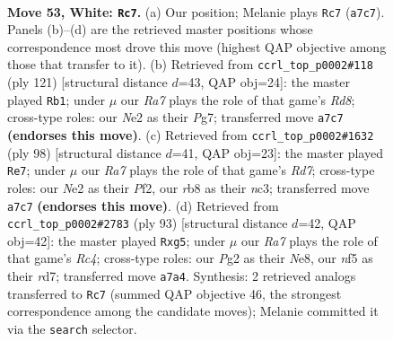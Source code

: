 \documentclass[11pt]{article}
\begin{document}
\clearpage

\begin{figure}[p]\centering
\begin{subfigure}{0.46\textwidth}\centering
\resizebox{\linewidth}{!}{%
\newchessgame
\chessboard[
  setfen={1r6/R7/3pk3/5npp/8/1p6/1R2NKPr/8 w - - 4 53},
  showmover=false,
  pgfstyle=straightmove, color=movearrow, markmove={a7-c7}
]}
\caption{}
\end{subfigure}\hfill
\begin{subfigure}{0.46\textwidth}\centering
\resizebox{\linewidth}{!}{%
\newchessgame
\chessboard[
  setfen={1r4k1/6p1/7p/1P2R2P/8/1N6/R1p2KP1/3r4 b - - 0 61},
  showmover=false,
  pgfstyle=straightmove, color=movearrow, markmove={d1-b1}
]}
\caption{}
\end{subfigure}
\\[4pt]
\begin{subfigure}{0.46\textwidth}\centering
\resizebox{\linewidth}{!}{%
\newchessgame
\chessboard[
  setfen={4N3/3R4/r6p/4b1pk/4p3/2n5/5PKP/4R3 w - - 6 50},
  showmover=false,
  pgfstyle=straightmove, color=movearrow, markmove={d7-e7}
]}
\caption{}
\end{subfigure}\hfill
\begin{subfigure}{0.46\textwidth}\centering
\resizebox{\linewidth}{!}{%
\newchessgame
\chessboard[
  setfen={R3nk2/3R4/p5p1/2r3P1/P2N4/1P2r3/1K6/8 b - - 20 47},
  showmover=false,
  pgfstyle=straightmove, color=movearrow, markmove={c5-g5}
]}
\caption{}
\end{subfigure}
\caption{\textbf{Move 53, White: \texttt{Rc7}.} (a) Our position; Melanie plays \texttt{Rc7} (\texttt{a7c7}). Panels (b)--(d) are the retrieved master positions whose correspondence most drove this move (highest QAP objective among those that transfer to it). (b) Retrieved from \texttt{ccrl\_top\_p0002\#118} (ply 121) [structural distance $d$=43, QAP obj=24]: the master played \texttt{Rb1}; under $\mu$ our \emph{Ra7} plays the role of that game's \emph{Rd8}; cross-type roles: our \emph{N}e2 as their \emph{P}g7; transferred move \texttt{a7c7} \textbf{(endorses this move)}. (c) Retrieved from \texttt{ccrl\_top\_p0002\#1632} (ply 98) [structural distance $d$=41, QAP obj=23]: the master played \texttt{Re7}; under $\mu$ our \emph{Ra7} plays the role of that game's \emph{Rd7}; cross-type roles: our \emph{N}e2 as their \emph{P}f2, our \emph{r}b8 as their \emph{n}c3; transferred move \texttt{a7c7} \textbf{(endorses this move)}. (d) Retrieved from \texttt{ccrl\_top\_p0002\#2783} (ply 93) [structural distance $d$=42, QAP obj=42]: the master played \texttt{Rxg5}; under $\mu$ our \emph{Ra7} plays the role of that game's \emph{Rc4}; cross-type roles: our \emph{P}g2 as their \emph{N}e8, our \emph{n}f5 as their \emph{r}d7; transferred move \texttt{a7a4}. Synthesis: 2 retrieved analogs transferred to \texttt{Rc7} (summed QAP objective 46, the strongest correspondence among the candidate moves); Melanie committed it via the \texttt{search} selector.}
\label{fig:thought-m104}
\end{figure}
\end{document}
